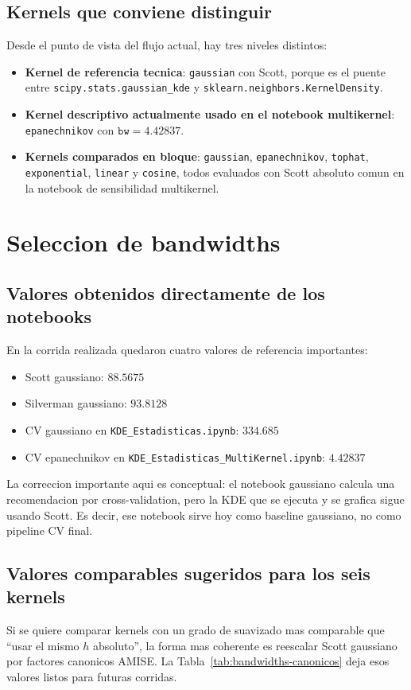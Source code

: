 \documentclass[11pt,a4paper]{article}
\begin{document}
\subsection{Kernels que conviene distinguir}
Desde el punto de vista del flujo actual, hay tres niveles distintos:
\begin{itemize}[leftmargin=1.5em]
\item \textbf{Kernel de referencia tecnica}: \texttt{gaussian} con Scott, porque es el puente entre
      \texttt{scipy.stats.gaussian\_kde} y \texttt{sklearn.neighbors.KernelDensity}.
\item \textbf{Kernel descriptivo actualmente usado en el notebook multikernel}: \texttt{epanechnikov}
      con \(\texttt{bw}=4.42837\).
\item \textbf{Kernels comparados en bloque}: \texttt{gaussian}, \texttt{epanechnikov},
      \texttt{tophat}, \texttt{exponential}, \texttt{linear} y \texttt{cosine}, todos evaluados con
      Scott absoluto comun en la notebook de sensibilidad multikernel.
\end{itemize}

\section{Seleccion de bandwidths}
\subsection{Valores obtenidos directamente de los notebooks}
En la corrida realizada quedaron cuatro valores de referencia importantes:
\begin{itemize}[leftmargin=1.5em]
\item Scott gaussiano: \(88.5675\)
\item Silverman gaussiano: \(93.8128\)
\item CV gaussiano en \texttt{KDE\_Estadisticas.ipynb}: \(334.685\)
\item CV epanechnikov en \texttt{KDE\_Estadisticas\_MultiKernel.ipynb}: \(4.42837\)
\end{itemize}

La correccion importante aqui es conceptual: el notebook gaussiano calcula una recomendacion por
cross-validation, pero la KDE que se ejecuta y se grafica sigue usando Scott. Es decir, ese notebook
sirve hoy como baseline gaussiano, no como pipeline CV final.

\subsection{Valores comparables sugeridos para los seis kernels}
Si se quiere comparar kernels con un grado de suavizado mas comparable que ``usar el mismo
\(h\) absoluto'', la forma mas coherente es reescalar Scott gaussiano por factores canonicos AMISE.
La Tabla~\ref{tab:bandwidths-canonicos} deja esos valores listos para futuras corridas.
\end{document}
